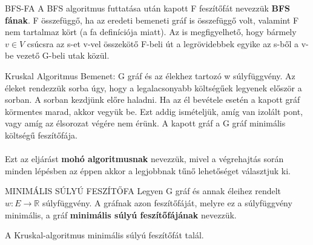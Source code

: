\begin{definicio}{BFS-FA}
  A BFS algoritmus futtatása után kapott F feszítőfát nevezzük \textbf{BFS fának}. F összefüggő, ha az eredeti bemeneti gráf is összefüggő volt, valamint F nem tartalmaz kört (a fa definíciója miatt). Az is megfigyelhető, hogy bármely $v \in V$ csúcsra az s-et v-vel összekötő F-beli út a legrövidebbek egyike az s-ből a v-be vezető G-beli utak közül.
\end{definicio}

\begin{tetel}{Kruskal Algoritmus}
Bemenet: G gráf és az élekhez tartozó w súlyfüggvény. Az éleket rendezzük sorba úgy, hogy a legalacsonyabb költségűek legyenek először a sorban. A sorban kezdjünk előre haladni. Ha az él bevétele esetén a kapott gráf körmentes marad, akkor vegyük be. Ezt addig ismételjük, amíg van izolált pont, vagy amíg az élsorozat végére nem érünk. A kapott gráf a G gráf minimális költségű feszítőfája.
\\
\\
Ezt az eljárást \textbf{mohó algoritmusnak} nevezzük, mivel a végrehajtás során minden lépésben az éppen akkor a legjobbnak tűnő lehetőséget választjuk ki.
\end{tetel}

\begin{definicio}{MINIMÁLIS SÚLYÚ FESZÍTŐFA}
Legyen G gráf és annak éleihez rendelt $w: E \rightarrow \mathbb{R}$ súlyfüggvény. A gráfnak azon feszítőfáját, melyre ez a súlyfüggvény minimális, a gráf \textbf{minimális súlyú feszítőfájának} nevezzük.
\end{definicio}

\begin{tetel}{}
A Kruskal-algoritmus minimális súlyú feszítőfát talál.
\end{tetel}

